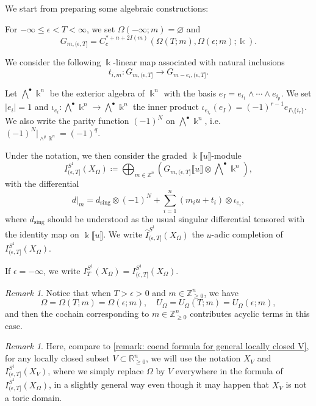\documentclass[11pt]{amsart}
\numberwithin{equation}{section}
\theoremstyle{plain}
\theoremstyle{definition}
\theoremstyle{remark}
\newtheorem{RMK}[rmk]{Remark}
\newcommand{\bZ} { {\mathbb{Z}}}
\newcommand{\bR} { {\mathbb{R}}}
\newcommand{\fpw}[1]{{\llbracket #1\rrbracket}}
\begin{document}
We start from preparing some algebraic constructions:

For $-\infty\leq \epsilon<T<\infty$, we set $\Omega(-\infty;m)=\varnothing$ and
\[G_{m,(\epsilon,T]}=C^{*+n+2I(m)}_c({\Omega(T;m)},\Omega(\epsilon;m) ;\Bbbk  ).\]


We consider the following $\Bbbk $-linear map associated with natural inclusions
\[t_{i,m}:G_{m,(\epsilon,T]} \to G_{m-e_i,(\epsilon,T]}.\]



Let $\bigwedge^\bullet\Bbbk ^n$ be the exterior algebra of $\Bbbk ^n$ with the basis $e_{I}=e_{i_1}\wedge \cdots\wedge e_{i_p}$. We set $|e_i|=1$ and $\iota_{e_i}:\bigwedge^\bullet\Bbbk ^n\to \bigwedge^\bullet\Bbbk ^n$ the inner product $\iota_{e_{i_r}}(e_{I})=(-1)^{r-1}e_{I\setminus \{i_r\}}$. We also write the parity function $(-1)^N$ on $\bigwedge^\bullet\Bbbk ^n$, i.e. $(-1)^N|_{\wedge^q\Bbbk ^n}=(-1)^q$. 

Under the notation, we then consider the graded $\Bbbk\fpw{u}$-module
\[I_{(\epsilon,T]}^{S^1}(X_\Omega)\coloneqq \bigoplus_{m\in \bZ^n}\left( G_{m,(\epsilon,T]}  \fpw{u} \otimes \bigwedge\nolimits^\bullet \Bbbk ^n\right),\]
with the differential
\begin{equation}\label{equation: differential chain model}d|_m=d_{\mathrm{sing}}\otimes (-1)^N+\sum_{i=1}^n  (m_iu+t_i)\otimes \iota_{e_i},\end{equation}
where $d_\mathrm{sing}$ should be understood as the usual singular differential tensored with the identity map on $\Bbbk\fpw{u}$. We write $\widehat{I}_{(\epsilon,T]}^{S^1}(X_\Omega)$ the $u$-adic completion of $I_{(\epsilon,T]}^{S^1}(X_\Omega)$. 

If $\epsilon =-\infty$, we write $I_{T}^{S^1}(X_\Omega)=I_{(\epsilon,T]}^{S^1}(X_\Omega)$.

 
\begin{RMK}\label{remark: toric chain model positive lattice trivial}Notice that when $T>\epsilon>0$ and $m\in \bZ_{\geq 0}^n$, we have 
\[\Omega=\Omega(T;m)=\Omega(\epsilon;m),\quad U_\Omega=U_\Omega(T;m)=U_\Omega(\epsilon;m),\]
and then the cochain corresponding to $m\in \bZ_{\geq 0}^n$ contributes acyclic terms in this case.
\end{RMK}
\begin{RMK}\label{remark: abuse notation for the chain model for locally closed sets}Here, compare to \autoref{remark: coend formula for general locally closed V}, for any locally closed subset $V\subset \bR^n_{\geq 0}$, we will use the notation $X_V$ and $I_{(\epsilon,T]}^{S^1}(X_V)$, where we simply replace $\Omega$ by $V$ everywhere in the formula of $I_{(\epsilon,T]}^{S^1}(X_\Omega)$, in a slightly general way even though it may happen that $X_V$ is not a toric domain.
\end{RMK}
\end{document}
